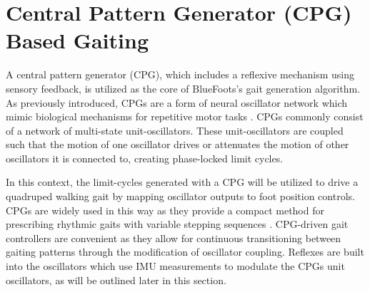 	\section{Central Pattern Generator (CPG) Based Gaiting}
		\label{sec::cpg_gait_control}
		A central pattern generator (CPG), which includes a reflexive mechanism using sensory feedback, is utilized as the core of BlueFoots's gait generation algorithm. As previously introduced, CPGs are a form of neural oscillator network which mimic biological mechanisms for repetitive motor tasks \cite{Ijspeert2008,Collins1993}. CPGs commonly consist of a network of multi-state unit-oscillators. These unit-oscillators are coupled such that the motion of one oscillator drives or attenuates the motion of other oscillators it is connected to, creating phase-locked limit cycles.

		In this context, the limit-cycles generated with a CPG will be utilized to drive a quadruped  walking gait by mapping oscillator outputs to foot position controls. CPGs are widely used in this way as they provide a compact method for prescribing rhythmic gaits with variable stepping sequences \cite{Righetti2006,Castro2008,Li2014}. CPG-driven gait controllers are convenient as they allow for continuous transitioning between gaiting patterns through the modification of oscillator coupling. Reflexes are built into the oscillators which use IMU measurements to modulate the CPGs unit oscillators, as will be outlined later in this section.

